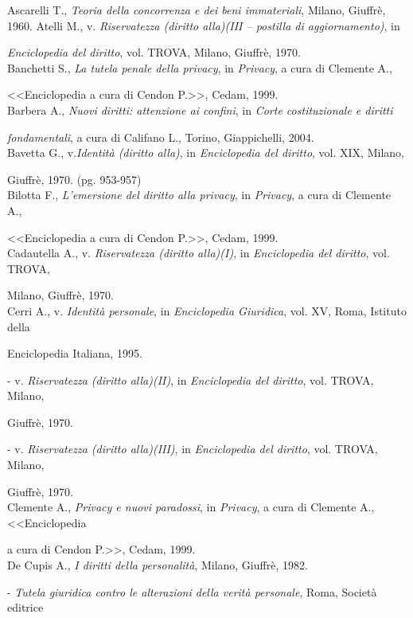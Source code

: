 Ascarelli T., \textit{Teoria della concorrenza e dei beni immateriali}, Milano, Giuffrè, 1960.
Atelli M., v. \textit{Riservatezza (diritto alla)(III – postilla di aggiornamento)}, in 

\textit{Enciclopedia del diritto}, vol. TROVA, Milano, Giuffrè, 1970. 
\\Banchetti S., \textit{La tutela penale della privacy}, in \textit{Privacy}, a cura di Clemente A.,

<<Enciclopedia a cura di Cendon P.>>, Cedam, 1999.
\\Barbera A., \textit{Nuovi diritti: attenzione ai confini}, in \textit{Corte costituzionale e diritti} 

\textit{fondamentali}, a cura di Califano L., Torino, Giappichelli, 2004.
\\Bavetta G., v.\textit{Identità (diritto alla)}, in \textit{Enciclopedia del diritto}, vol. XIX, Milano,

Giuffrè, 1970. (pg. 953-957)
\\Bilotta F., \textit{L’emersione del diritto alla privacy}, in \textit{Privacy}, a cura di Clemente A.,

<<Enciclopedia a cura di Cendon P.>>, Cedam, 1999.
\\Cadautella A., v. \textit{Riservatezza (diritto alla)(I)}, in \textit{Enciclopedia del diritto}, vol. TROVA,

Milano, Giuffrè, 1970. 
\\Cerri A., v. \textit{Identità personale}, in \textit{Enciclopedia Giuridica},  vol. XV, Roma, Istituto della

Enciclopedia Italiana, 1995.


- v. \textit{Riservatezza (diritto alla)(II)}, in \textit{Enciclopedia del diritto}, vol. TROVA, Milano,

Giuffrè, 1970. 

- v. \textit{Riservatezza (diritto alla)(III)}, in \textit{Enciclopedia del diritto}, vol. TROVA, Milano,

Giuffrè, 1970. 
\\Clemente A., \textit{Privacy e nuovi paradossi}, in \textit{Privacy}, a cura di Clemente A.,<<Enciclopedia 

a cura di Cendon P.>>, Cedam, 1999.
\\De Cupis A., \textit{I diritti della personalità}, Milano, Giuffrè, 1982.

-   \textit{Tutela giuridica contro le alterazioni della verità personale}, Roma, Società editrice

